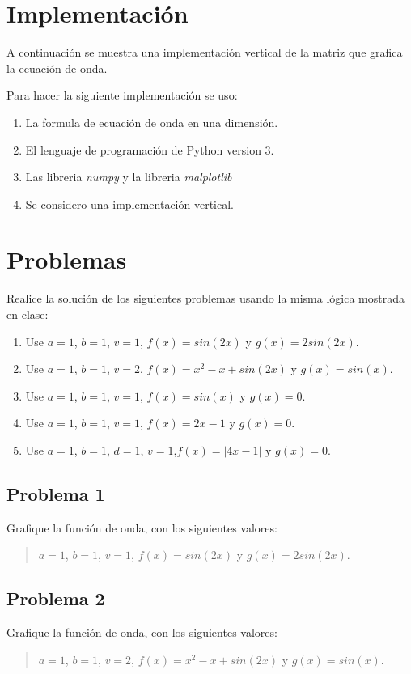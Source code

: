 \documentclass[a4paper,12pt]{article}
\newcommand{\eq}[1]{$#1$}
\begin{document}
    \section{Implementación}
    A continuación se muestra una implementación vertical de la matriz que grafica la ecuación de onda.
    
    Para hacer la siguiente implementación se uso:
    \begin{enumerate}
        \item La formula de ecuación de onda en una dimensión.
        \item El lenguaje de programación de Python version 3.
        \item Las libreria \emph{numpy} y la libreria \emph{malplotlib}
        \item Se considero una implementación vertical.
    \end{enumerate}

    \section{Problemas}
    Realice la solución de los siguientes problemas usando la 
    misma lógica mostrada en clase:
    \begin{enumerate}
        \item Use \eq{a = 1}, \eq{b = 1}, \eq{v = 1}, \eq{f(x) = sin(2x)} y \eq{g(x) = 2sin(2x)}.
        \item Use \eq{a = 1}, \eq{b = 1}, \eq{v = 2}, \eq{f(x) = x^2 - x + sin(2x)} y \eq{g(x) = sin(x)}.
        \item Use \eq{a = 1}, \eq{b = 1}, \eq{v = 1}, \eq{f(x) = sin(x)} y \eq{g(x) = 0}.
        \item Use \eq{a = 1}, \eq{b = 1}, \eq{v = 1}, \eq{f(x) = 2x - 1} y \eq{g(x) = 0}.
        \item Use \eq{a = 1}, \eq{b = 1}, \eq{d = 1}, \eq{v = 1},\eq{f(x) = |4x - 1|} y \eq{g(x) = 0}.
    \end{enumerate}
    \subsection{Problema 1}
    Grafique la función de onda, con los siguientes valores:
    \begin{quote}
        \centering
        \eq{a = 1}, \eq{b = 1}, \eq{v = 1}, \eq{f(x) = sin(2x)} y \eq{g(x) = 2sin(2x)}.
    \end{quote}
    \subsection{Problema 2}
    Grafique la función de onda, con los siguientes valores:
    \begin{quote}
        \centering
        \eq{a = 1}, \eq{b = 1}, \eq{v = 2}, \eq{f(x) = x^2 - x + sin(2x)} y \eq{g(x) = sin(x)}.
    \end{quote}
\end{document}

